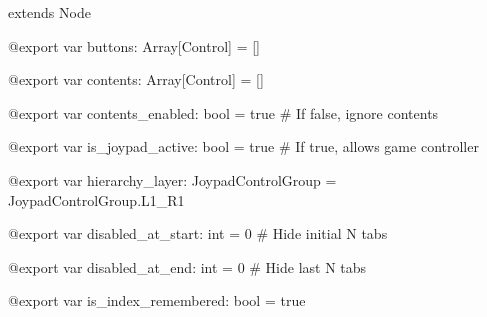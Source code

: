 extends Node

@export var buttons: Array{[}Control{]} = {[}{]}

@export var contents: Array{[}Control{]} = {[}{]}

@export var contents\_enabled: bool = true \# If false, ignore contents

@export var is\_joypad\_active: bool = true \# If true, allows game
controller

@export var hierarchy\_layer: JoypadControlGroup =
JoypadControlGroup.L1\_R1

@export var disabled\_at\_start: int = 0 \# Hide initial N tabs

@export var disabled\_at\_end: int = 0 \# Hide last N tabs

@export var is\_index\_remembered: bool = true
